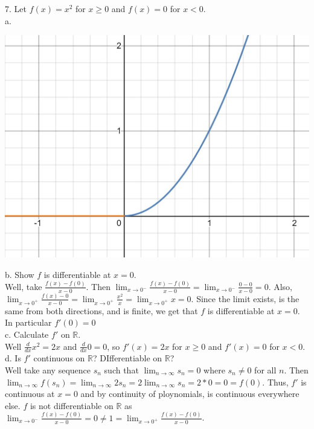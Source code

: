 \documentclass[12pt]{article}
\begin{document}
7. Let $f(x)=x^2$ for $x\geq0$ and $f(x)=0$ for $x<0$.\\
a. \begin{center}
	\includegraphics[scale=1]{graph.JPG}\\
\end{center}
b. Show $f$ is differentiable at $x=0$.\\
Well, take $\frac{f(x)-f(0)}{x-0}$. Then $\lim_{x\rightarrow0^-}\frac{f(x)-f(0)}{x-0}=\lim_{x\rightarrow0^-}\frac{0-0}{x-0}=0$. Also, $\lim_{x\rightarrow0^+}\frac{f(x)-0}{x-0}=\lim_{x\rightarrow0^+}\frac{x^2}{x}=\lim_{x\rightarrow0^+}x=0$. Since the limit exists, is the same from both directions, and is finite, we get that $f$ is differentiable at $x=0$. In particular $f'(0)=0$\\
c. Calculate $f'$ on $\mathbb{R}$.\\
Well $\frac{d}{dx}x^2=2x$ and $\frac{d}{dx}0=0$, so $f'(x)=2x$ for $x\geq0$ and $f'(x)=0$ for $x<0$.\\
d. Is $f'$ continuous on $\mathbb{R}$? DIfferentiable on $\mathbb{R}$?\\
Well take any sequence $s_n$ such that $\lim_{n\rightarrow\infty}s_n=0$ where $s_n\neq0$ for all $n$. Then $\lim_{n\rightarrow\infty}f(s_n)=\lim_{n\rightarrow\infty}2s_n=2\lim_{n\rightarrow\infty}s_n=2*0=0=f(0)$. Thus, $f'$ is continuous at $x=0$ and by continuity of ploynomials, is continuous everywhere else. $f$ is not differentiable on $\mathbb{R}$ as $\lim_{x\rightarrow0^-}\frac{f(x)-f(0)}{x-0}=0\neq1=\lim_{x\rightarrow0^+}\frac{f(x)-f(0)}{x-0}$.\\[20pt]
\end{document}
